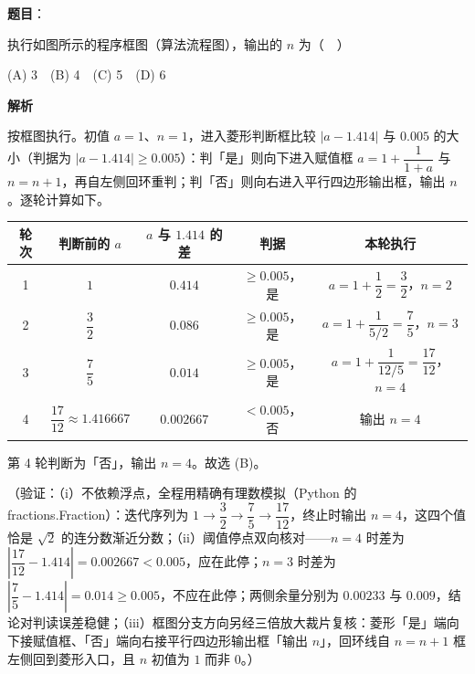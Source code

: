 \begin{answer}

\textbf{题目}：

执行如图所示的程序框图（算法流程图），输出的 \(n\) 为（　）
\nopagebreak[4]
\begin{center}\end{center}
\nopagebreak[4]
(A) 3　(B) 4　(C) 5　(D) 6

\textbf{解析}

按框图执行。初值 \(a=1\)、\(n=1\)，进入菱形判断框比较 \(|a-1.414|\) 与 \(0.005\) 的大小（判据为 \(|a-1.414|\geqslant 0.005\)）：判「是」则向下进入赋值框 \(a=1+\dfrac{1}{1+a}\) 与 \(n=n+1\)，再自左侧回环重判；判「否」则向右进入平行四边形输出框，输出 \(n\)。逐轮计算如下。

\begin{center}
\begin{tabular}{ccccc}
\toprule
轮次 & 判断前的 \(a\) & \(a\) 与 \(1.414\) 的差 & 判据 & 本轮执行 \\
\midrule
1 & \(1\) & \(0.414\) & \(\geqslant 0.005\)，是 & \(a=1+\dfrac{1}{2}=\dfrac{3}{2}\)，\(n=2\) \\
2 & \(\dfrac{3}{2}\) & \(0.086\) & \(\geqslant 0.005\)，是 & \(a=1+\dfrac{1}{5/2}=\dfrac{7}{5}\)，\(n=3\) \\
3 & \(\dfrac{7}{5}\) & \(0.014\) & \(\geqslant 0.005\)，是 & \(a=1+\dfrac{1}{12/5}=\dfrac{17}{12}\)，\(n=4\) \\
4 & \(\dfrac{17}{12}\approx 1.416667\) & \(0.002667\) & \(<0.005\)，否 & 输出 \(n=4\) \\
\bottomrule
\end{tabular}
\end{center}

第 4 轮判断为「否」，输出 \(n=4\)。故选 (B)。

（验证：（i）不依赖浮点，全程用精确有理数模拟（Python 的 fractions.Fraction）：迭代序列为 \(1\to\dfrac{3}{2}\to\dfrac{7}{5}\to\dfrac{17}{12}\)，终止时输出 \(n=4\)，这四个值恰是 \(\sqrt{2}\) 的连分数渐近分数；（ii）阈值停点双向核对——\(n=4\) 时差为 \(\left|\dfrac{17}{12}-1.414\right|=0.002667<0.005\)，应在此停；\(n=3\) 时差为 \(\left|\dfrac{7}{5}-1.414\right|=0.014\geqslant 0.005\)，不应在此停；两侧余量分别为 \(0.00233\) 与 \(0.009\)，结论对判读误差稳健；（iii）框图分支方向另经三倍放大裁片复核：菱形「是」端向下接赋值框、「否」端向右接平行四边形输出框「输出 \(n\)」，回环线自 \(n=n+1\) 框左侧回到菱形入口，且 \(n\) 初值为 \(1\) 而非 \(0\)。）


\end{answer}
